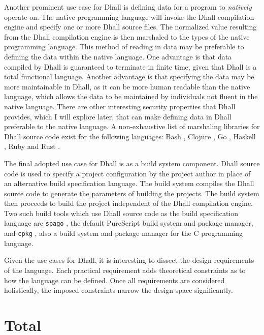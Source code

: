 \documentclass[12pt]{diazessay}
\begin{document}
Another prominent use case for Dhall is defining data for a program to \emph{natively} operate on.
The native programming language will invoke the Dhall compilation engine and specify one or more Dhall source files.
The normalized value resulting from the Dhall compilation engine is then marshaled to the types of the native programming language.
This method of reading in data may be preferable to defining the data within the native language.
One advantage is that data compiled by Dhall is guaranteed to terminate in finite time, given that Dhall is a total functional language.
Another advantage is that specifying the data may be more maintainable in Dhall, as it can be more human readable than the native language, which allows the data to be maintained by individuals not fluent in the native language.
There are other interesting security properties that Dhall provides, which I will explore later, that can make defining data in Dhall preferable to the native language.
A non-exhaustive list of marshaling libraries for Dhall source code exist for the following languages: Bash \cite{DhallBash}, Clojure \cite{DhallClojure}, Go \cite{DhallGo}, Haskell \cite{DhallHaskell}, Ruby \cite{DhallRuby} and Rust \cite{DhallRust}.

The final adopted use case for Dhall is as a build system component.
Dhall source code is used to specify a project configuration by the project author in place of an alternative build specification language.
The build system compiles the Dhall source code to generate the parameters of building the projects.
The build system then proceeds to build the project independent of the Dhall compilation engine.
Two such build tools which use Dhall source code as the build specification language are \texttt{spago} \cite{Spago}, the default PureScript build system and package manager, and \texttt{cpkg} \cite{cpkg}, also a build system and package manager for the C programming language.

Given the use cases for Dhall, it is interesting to dissect the design requirements of the language.
Each practical requirement adds theoretical constraints as to how the language can be defined.
Once all requirements are considered holistically, the imposed constraints narrow the design space significantly.

\section*{Total}
\end{document}
